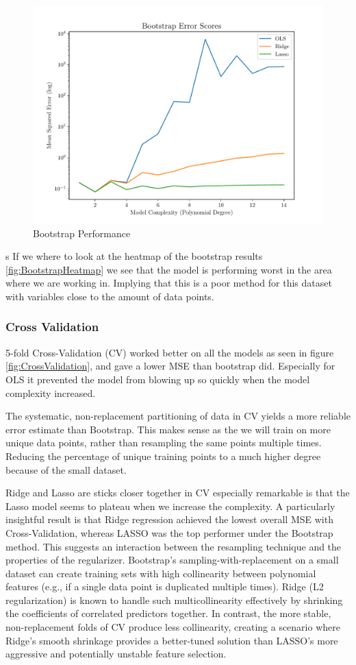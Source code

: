 \documentclass[twocolumn,aps]{revtex4}
\begin{document}
\begin{figure}[h]
    \centering
    \includegraphics[width=.95 \linewidth]{Figures/Bootstrap.pdf}
    \caption{Bootstrap Performance}
    \label{fig:BootstrapPerformance}
\end{figure}
s
If we where to look at the heatmap of the bootstrap results \ref{fig:BootstrapHeatmap} we see that the model is performing worst in the area where we are working in.
Implying that this is a poor method for this dataset with variables close to the amount of data points.


\subsubsection{Cross Validation}
5-fold Cross-Validation (CV) worked better on all the models as seen in figure \ref{fig:CrossValidation}, and gave a lower MSE than bootstrap did.
Especially for OLS it prevented the model from blowing up so quickly when the model complexity increased.

The systematic, non-replacement partitioning of data in CV yields a more reliable error estimate than Bootstrap.
This makes sense as the we will train on more unique data points, rather than resampling the same points multiple times.
Reducing the percentage of unique training points to a much higher degree because of the small dataset.

Ridge and Lasso are sticks closer together in CV especially remarkable is that the Lasso model seems to plateau when we increase the complexity.
A particularly insightful result is that Ridge regression achieved the lowest overall MSE with Cross-Validation, whereas LASSO was the top performer under the Bootstrap method. 
This suggests an interaction between the resampling technique and the properties of the regularizer. 
Bootstrap's sampling-with-replacement on a small dataset can create training sets with high collinearity between polynomial features (e.g., if a single data point is duplicated multiple times). 
Ridge (L2 regularization) is known to handle such multicollinearity effectively by shrinking the coefficients of correlated predictors together. 
In contrast, the more stable, non-replacement folds of CV produce less collinearity, creating a scenario where Ridge's smooth shrinkage provides a better-tuned solution than LASSO's more aggressive and potentially unstable feature selection.
\end{document}
